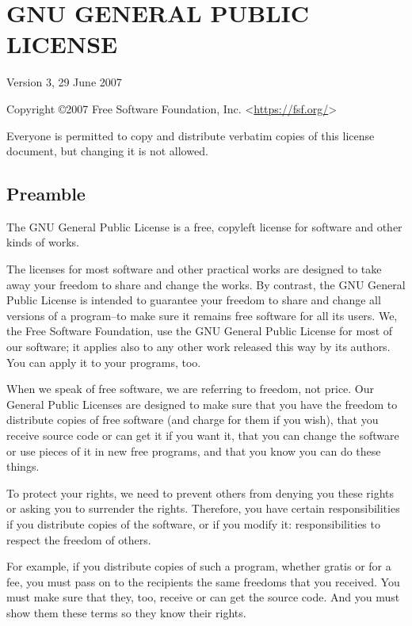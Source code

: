 \chapter{GNU GENERAL PUBLIC LICENSE}
\begin{center} Version 3, 29 June 2007 \end{center}
Copyright \copyright 2007 Free Software Foundation, Inc. <\url{https://fsf.org/}>\par
Everyone is permitted to copy and distribute verbatim copies of this license document, but changing it is not allowed.\par
\section{Preamble}
The GNU General Public License is a free, copyleft license for software and other kinds of works.\par
The licenses for most software and other practical works are designed to take away your freedom to share and change the works. By contrast, the GNU General Public License is intended to guarantee your freedom to share and change all versions of a program--to make sure it remains free software for all its users. We, the Free Software Foundation, use the GNU General Public License for most of our software; it applies also to any other work released this way by its authors. You can apply it to your programs, too.\par
When we speak of free software, we are referring to freedom, not price. Our General Public Licenses are designed to make sure that you have the freedom to distribute copies of free software (and charge for them if you wish), that you receive source code or can get it if you want it, that you can change the software or use pieces of it in new free programs, and that you know you can do these things.\par
To protect your rights, we need to prevent others from denying you these rights or asking you to surrender the rights. Therefore, you have certain responsibilities if you distribute copies of the software, or if you modify it: responsibilities to respect the freedom of others.\par
For example, if you distribute copies of such a program, whether gratis or for a fee, you must pass on to the recipients the same freedoms that you received. You must make sure that they, too, receive or can get the source code. And you must show them these terms so they know their rights.\par
